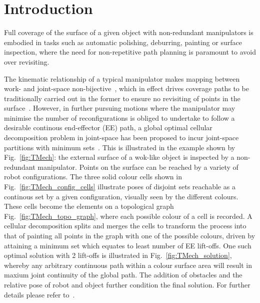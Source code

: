 \documentclass[journal]{IEEEtran}
\begin{document}
\IEEEpeerreviewmaketitle
\section{Introduction}
Full coverage of the surface of a given object with non-redundant manipulators is embodied in tasks such as 
automatic polishing, deburring, painting or surface inspection, where the need for non-repetitive path planning 
is paramount to avoid over revisiting. 

The kinematic relationship of a typical manipulator makes mapping between work- and joint-space 
non-bijective~\cite{lavalle2006planning}, which in effect drives coverage paths to be traditionally carried out in the former to 
ensure no revisiting of points in the surface~\cite{Oriolo2005Motion}. However, in further pursuing motions 
where the manipulator may minimise the number of reconfigurations is obliged to undertake to follow a desirable 
continous end-effector (EE) path, a global optimal cellular decomposition problem in joint-space has been 
proposed to incur joint-space partitions with minimum sets~\cite{Yang2020Cellular}. This is illustrated in 
the example shown by Fig.~\ref{fig:TMech}: the external surface of a wok-like object is inspected by a 
non-redundant manipulator. Points on the surface can be reached by a variety of robot configurations. 
The three solid colour cells shown in Fig.~\ref{fig:TMech_config_cells} illustrate poses of disjoint sets reachable 
as a continous set by a given configuration, visually seen by the different colours. These cells become the elements 
on a topological graph Fig.~\ref{fig:TMech_topo_graph}, where each possible colour of a cell is recorded. 
A cellular decomposition splits and merges the cells to transform the process into that of painting all points in the 
graph with one of the possible colours, driven by attaining a minimum set which equates to least number of EE lift-offs. 
One such optimal solution with 2 lift-offs is illustrated in Fig.~\ref{fig:TMech_solution}, whereby any arbitrary 
continuous path within a colour surface area will result in maxium joint continuity of the global path. 
The addition of obstacles and the relative pose of robot and object further condition the final solution. 
For further details please refer to~\cite{Yang2020Cellular}. 
\end{document}
